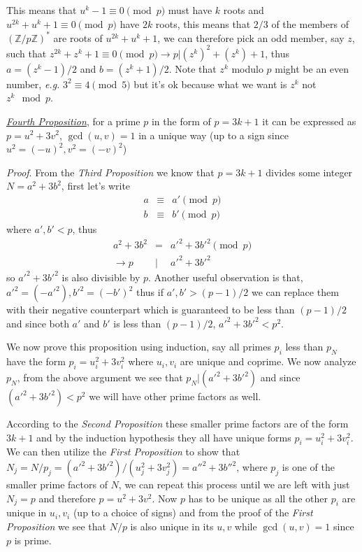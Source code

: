 \documentclass[aps,preprint,preprintnumbers,nofootinbib,showpacs,prd]{revtex4-1}
\newcommand{\eg}{{\it e.g.} }
\newcommand{\nbea}{\begin{eqnarray*}}
\newcommand{\neea}{\end{eqnarray*}}
\begin{document}
This means that $u^k - 1 \equiv 0 \pmod{p}$ must have $k$ roots and $u^{2k} + u^k + 1 \equiv 0 \pmod{p}$ have $2k$ roots, this means that $2/3$ of the members of $(\mathbb{Z}/p\mathbb{Z})^*$ are roots of $u^{2k} + u^k + 1$, we can therefore pick an odd member, say $z$, such that $z^{2k} + z^{k} + 1 \equiv 0 \pmod{p} \to p|(z^k)^2 + (z^k) + 1$, thus $a = (z^k-1)/2$ and $b = (z^k+1)/2$. Note that $z^k$ modulo $p$ might be an even number, \eg $3^2 \equiv 4 \pmod{5}$ but it's ok because what we want is $z^k$ not $z^k \mod p$.

\underline{\it Fourth Proposition}, for a prime $p$ in the form of $p = 3k+1$ it can be expressed as $p = u^2 + 3v^2$, $\gcd(u,v)=1$ in a unique way (up to a sign since $u^2 = (-u)^2, v^2 = (-v)^2$)

{\it Proof}. From the {\it Third Proposition} we know that $p = 3k + 1$ divides some integer $N=a^2 + 3b^2$, first let's write
%
\nbea
a & \equiv & a' \pmod{p} \\
b & \equiv & b' \pmod{p}
\neea
%
where $a',b' < p$, thus
%
\nbea
a^2 + 3b^2 & = & a'^2 + 3b'^2 \pmod{p} \\
\to p &|& a'^2 + 3b'^2
\neea
%
so $a'^2 + 3b'^2$ is also divisible by $p$. Another useful observation is that, $a'^2 = (-a'^2), b'^2 = (-b')^2$ thus if $a' , b'> (p-1)/2$ we can replace them with their negative counterpart which is guaranteed to be less than $(p-1)/2$ and since both $a'$ and $b'$ is less than $(p-1)/2$, $a'^2 + 3b'^2 < p^2$.

We now prove this proposition using induction, say all primes $p_i$ less than $p_N$ have the form $p_i = u_i^2 + 3v_i^2$ where $u_i, v_i$ are unique and coprime. We now analyze $p_N$, from the above argument we see that $p_N|(a'^2 + 3b'^2)$ and since $(a'^2 + 3b'^2) < p^2$ we will have other prime factors as well.

According to the {\it Second Proposition} these smaller prime factors are of the form $3k + 1$ and by the induction hypothesis they all have unique forms $p_i = u_i^2 + 3v_i^2$. We can then utilize the {\it First Proposition} to show that $N_j = N/p_j = (a'^2 + 3b'^2)/(u_j^2 + 3v_j^2) = a''^2 + 3b''^2$, where $p_j$ is one of the smaller prime factors of $N$, we can repeat this process until we are left with just $N_j = p$ and therefore $p = u^2 + 3v^2$. Now $p$ has to be unique as all the other $p_i$ are unique in $u_i, v_i$ (up to a choice of signs) and from the proof of the {\it First Proposition} we see that $N/p$ is also unique in its $u,v$ while $\gcd(u,v)=1$ since $p$ is prime.
\end{document}
